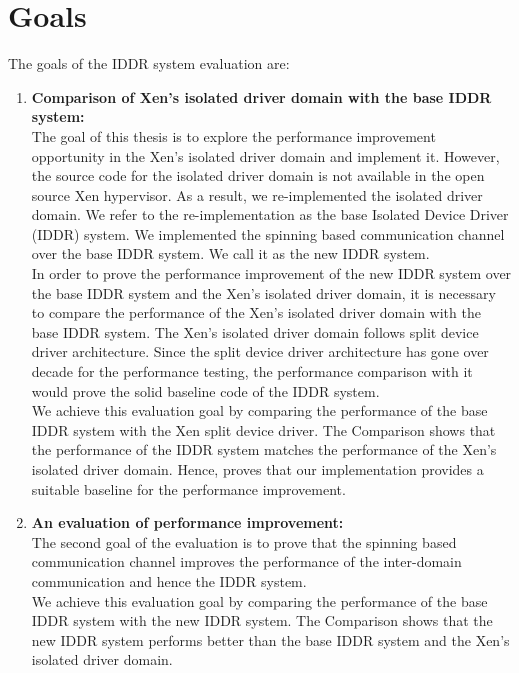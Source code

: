 \section{Goals}
\label{sec:goals}
The goals of the IDDR system evaluation are:
\begin{enumerate}
\item \textbf{Comparison  of Xen's isolated driver domain with the base IDDR system:}
\\[3mm]
The goal of this thesis is to explore the performance improvement opportunity in the Xen's isolated driver domain and implement it. However, the source code for the isolated driver domain is not available in the open source Xen hypervisor. As a result, we re-implemented the isolated driver domain. We refer to the re-implementation as the base Isolated Device Driver (IDDR) system. We implemented the spinning based communication channel over the base IDDR system. We call it as the new IDDR system.
\\[3mm]
In order to prove the performance improvement of the new IDDR system over the base IDDR system and the Xen's isolated driver domain, it is necessary to compare the performance of the Xen's isolated driver domain with the base IDDR system. The Xen's isolated driver domain follows split device driver architecture. Since the split device driver architecture has gone over decade for the performance testing, the performance comparison with it would prove the solid baseline code of the IDDR system. 
\\[3mm]
We achieve this evaluation goal by comparing the performance of the base IDDR system with the Xen split device driver. The Comparison  shows that the performance of the IDDR system matches the performance of the Xen's isolated driver domain. Hence, proves that our implementation provides a suitable baseline for the performance improvement.

\item \textbf{An evaluation of performance improvement:}
\\[3mm] 
The second goal of the evaluation is to prove that the spinning based communication channel improves the performance of the inter-domain communication and hence the IDDR system.
\\[3mm]
We achieve this evaluation goal by comparing the performance of the base IDDR system with the new IDDR system. The Comparison  shows that the new IDDR system performs better than the base IDDR system and the Xen's isolated driver domain.
\end{enumerate}

